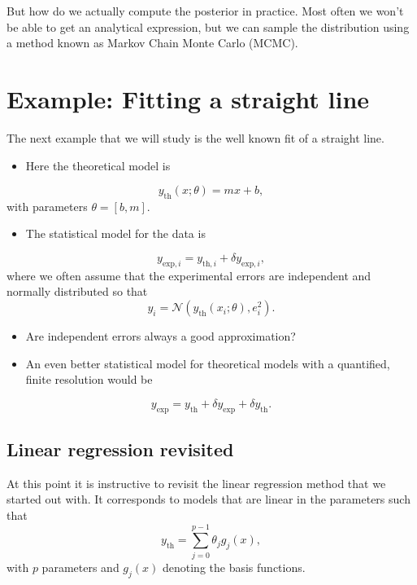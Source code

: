 \documentclass[%
oneside,                 %
final,                   %
10pt]{article}
\begin{document}
But how do we actually compute the posterior in practice. Most often we won't be able to get an analytical expression, but we can sample the distribution using a method known as Markov Chain Monte Carlo (MCMC).

\section{Example: Fitting a straight line}
The next example that we will study is the well known fit of a straight line.

\begin{itemize}
\item Here the theoretical model is
\end{itemize}

\noindent
\[
y_\mathrm{th}(x; \theta) = m x + b,
\]
with parameters $\theta = [b,m]$.

\begin{itemize}
\item The statistical model for the data is
\end{itemize}

\noindent
\[
y_{\mathrm{exp},i} = y_{\mathrm{th},i} + \delta y_{\mathrm{exp},i},
\]
where we often assume that the experimental errors are independent and normally distributed so that
\[
y_i = \mathcal{N} \left( y_\mathrm{th}(x_i; \theta), e_i^2 \right).
\]

\begin{itemize}
\item Are independent errors always a good approximation?

\item An even better statistical model for theoretical models with a quantified, finite resolution would be
\end{itemize}

\noindent
\[
y_\mathrm{exp} = y_\mathrm{th} + \delta y_\mathrm{exp} + \delta y_\mathrm{th}.
\]

\subsection{Linear regression revisited}
At this point it is instructive to revisit the linear regression method that we started out with. It corresponds to models that are linear in the parameters such that
\[
y_\mathrm{th} = \sum_{j=0}^{p-1} \theta_j g_j(x),
\]
with $p$ parameters and $g_j(x)$ denoting the basis functions.
\end{document}
